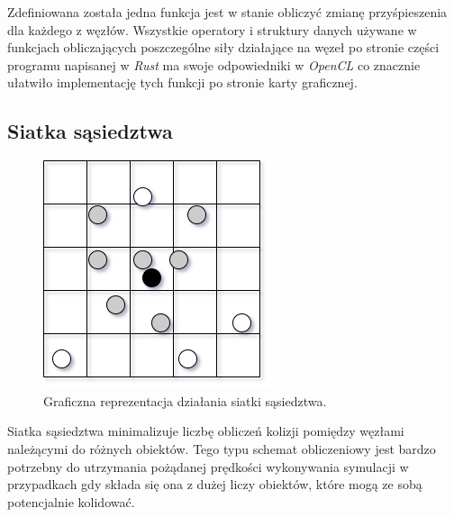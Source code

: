 \documentclass[12pt, letterpaper]{report}
\begin{document}
    
    Zdefiniowana została jedna funkcja jest w stanie obliczyć zmianę przyśpieszenia 
    dla każdego z węzłów. Wszystkie operatory i struktury danych używane w funkcjach
    obliczających poszczególne siły działające na węzeł po stronie części programu napisanej
    w \emph{Rust} ma swoje odpowiedniki w \emph{OpenCL} co znacznie ułatwiło implementację
    tych funkcji po stronie karty graficznej. 


    \clearpage
    \subsection{Siatka sąsiedztwa}

    \begin{figure}
        \includegraphics[width=0.99\linewidth]{neib_grid.drawio}
        \caption{
            Graficzna reprezentacja działania siatki sąsiedztwa.
        }
    \end{figure}

    Siatka sąsiedztwa minimalizuje liczbę obliczeń kolizji pomiędzy węzłami 
    należącymi do różnych obiektów. Tego typu schemat obliczeniowy jest 
    bardzo potrzebny do utrzymania 
    pożądanej prędkości wykonywania symulacji w przypadkach gdy składa się ona 
    z dużej liczy obiektów, które mogą ze sobą potencjalnie kolidować. \\
    
\end{document}
